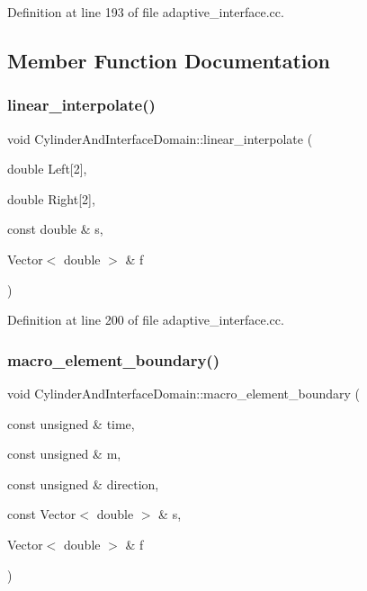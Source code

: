 Definition at line 193 of file adaptive\+\_\+interface.\+cc.



\subsection{Member Function Documentation}
\mbox{\label{classCylinderAndInterfaceDomain_acab40651417c703e6b3dc592198c7497}} 
\subsubsection{\texorpdfstring{linear\+\_\+interpolate()}{linear\_interpolate()}}
{\footnotesize\ttfamily void Cylinder\+And\+Interface\+Domain\+::linear\+\_\+interpolate (\begin{DoxyParamCaption}\item[{double}]{Left\mbox{[}2\mbox{]},  }\item[{double}]{Right\mbox{[}2\mbox{]},  }\item[{const double \&}]{s,  }\item[{Vector$<$ double $>$ \&}]{f }\end{DoxyParamCaption})\hspace{0.3cm}{\ttfamily [inline]}}



Definition at line 200 of file adaptive\+\_\+interface.\+cc.

\mbox{\label{classCylinderAndInterfaceDomain_a6afdef0d863b2833884aed2f571eeb79}} 
\subsubsection{\texorpdfstring{macro\+\_\+element\+\_\+boundary()}{macro\_element\_boundary()}}
{\footnotesize\ttfamily void Cylinder\+And\+Interface\+Domain\+::macro\+\_\+element\+\_\+boundary (\begin{DoxyParamCaption}\item[{const unsigned \&}]{time,  }\item[{const unsigned \&}]{m,  }\item[{const unsigned \&}]{direction,  }\item[{const Vector$<$ double $>$ \&}]{s,  }\item[{Vector$<$ double $>$ \&}]{f }\end{DoxyParamCaption})\hspace{0.3cm}{\ttfamily [inline]}}



